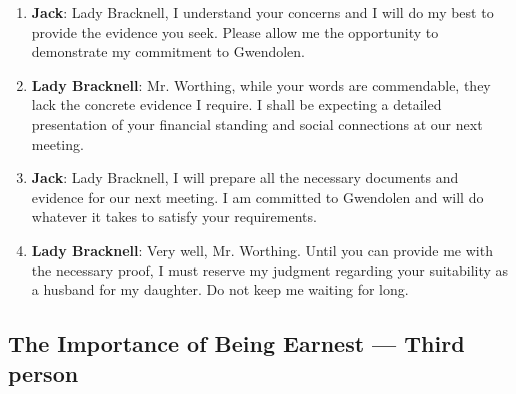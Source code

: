 \documentclass[10pt]{article}
\begin{document}
\begin{enumerate}
\item \textbf{Jack}: Lady Bracknell, I understand your concerns and I will do my best to provide the evidence you seek. Please allow me the opportunity to demonstrate my commitment to Gwendolen.

\item \textbf{Lady Bracknell}: Mr. Worthing, while your words are commendable, they lack the concrete evidence I require. I shall be expecting a detailed presentation of your financial standing and social connections at our next meeting.

\item \textbf{Jack}: Lady Bracknell, I will prepare all the necessary documents and evidence for our next meeting. I am committed to Gwendolen and will do whatever it takes to satisfy your requirements.

\item \textbf{Lady Bracknell}: Very well, Mr. Worthing. Until you can provide me with the necessary proof, I must reserve my judgment regarding your suitability as a husband for my daughter. Do not keep me waiting for long.

\end{enumerate}

\subsection*{The Importance of Being Earnest --- Third person}
\end{document}
